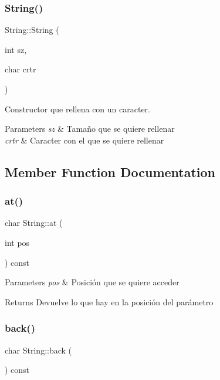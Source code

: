 \subsubsection{\texorpdfstring{String()}{String()}\hspace{0.1cm}{\footnotesize\ttfamily [4/4]}}
{\footnotesize\ttfamily String\+::\+String (\begin{DoxyParamCaption}\item[{int}]{sz,  }\item[{char}]{crtr }\end{DoxyParamCaption})}



Constructor que rellena con un caracter. 


\begin{DoxyParams}{Parameters}
{\em sz} & Tamaño que se quiere rellenar \\
\hline
{\em crtr} & Caracter con el que se quiere rellenar \\
\hline
\end{DoxyParams}


\subsection{Member Function Documentation}
\mbox{\label{class_string_a61572c111aa3d8af654e244ac367408e}} 
\subsubsection{\texorpdfstring{at()}{at()}}
{\footnotesize\ttfamily char String\+::at (\begin{DoxyParamCaption}\item[{int}]{pos }\end{DoxyParamCaption}) const}


\begin{DoxyParams}{Parameters}
{\em pos} & Posición que se quiere acceder \\
\hline
\end{DoxyParams}
\begin{DoxyReturn}{Returns}
Devuelve lo que hay en la posición del parámetro 
\end{DoxyReturn}
\mbox{\label{class_string_a3ca787cbf830a5ce99e18243bd841279}} 
\subsubsection{\texorpdfstring{back()}{back()}}
{\footnotesize\ttfamily char String\+::back (\begin{DoxyParamCaption}{ }\end{DoxyParamCaption}) const}

